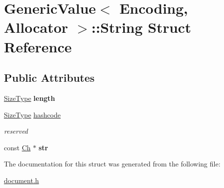 \hypertarget{a00291}{}\section{Generic\+Value$<$ Encoding, Allocator $>$\+:\+:String Struct Reference}
\label{a00291}
\subsection*{Public Attributes}
\begin{DoxyCompactItemize}
\item 
\hyperlink{a00677_a5ed6e6e67250fadbd041127e6386dcb5}{Size\+Type} {\bfseries length}\hypertarget{a00291_ad6ffab0e093aa8db6e415812ff6443bf}{}\label{a00291_ad6ffab0e093aa8db6e415812ff6443bf}

\item 
\hyperlink{a00677_a5ed6e6e67250fadbd041127e6386dcb5}{Size\+Type} \hyperlink{a00291_a73631052aeb72fbabb6eaab0175f858e}{hashcode}\hypertarget{a00291_a73631052aeb72fbabb6eaab0175f858e}{}\label{a00291_a73631052aeb72fbabb6eaab0175f858e}

\begin{DoxyCompactList}\small\item\em reserved \end{DoxyCompactList}\item 
const \hyperlink{a00130_ade0e0ce64ccd5d852da57a35e720bafb}{Ch} $\ast$ {\bfseries str}\hypertarget{a00291_a4eebc5acf3f93ab833efd82abf3ba84d}{}\label{a00291_a4eebc5acf3f93ab833efd82abf3ba84d}

\end{DoxyCompactItemize}


The documentation for this struct was generated from the following file\+:\begin{DoxyCompactItemize}
\item 
\hyperlink{a00473}{document.\+h}\end{DoxyCompactItemize}
